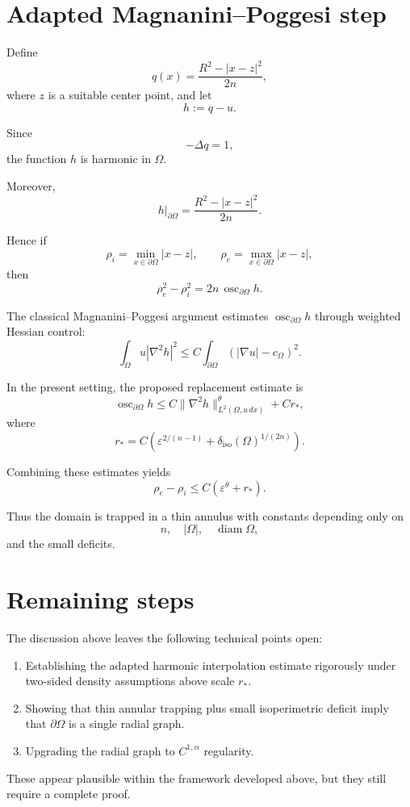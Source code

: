 \documentclass[11pt]{article}
\newcommand{\eps}{\varepsilon}
\newcommand{\deliso}{\delta_{\mathrm{iso}}}
\begin{document}
\section{Adapted Magnanini--Poggesi step}

Define
\[
q(x)
=
\frac{R^2-|x-z|^2}{2n},
\]
where $z$ is a suitable center point, and let
\[
h:=q-u.
\]

Since
\[
-\Delta q=1,
\]
the function $h$ is harmonic in $\Omega$.

Moreover,
\[
h|_{\partial\Omega}
=
\frac{R^2-|x-z|^2}{2n}.
\]

Hence if
\[
\rho_i
=
\min_{x\in\partial\Omega}|x-z|,
\qquad
\rho_e
=
\max_{x\in\partial\Omega}|x-z|,
\]
then
\[
\rho_e^2-\rho_i^2
=
2n\,
\operatorname{osc}_{\partial\Omega} h.
\]

The classical Magnanini--Poggesi argument estimates
$\operatorname{osc}_{\partial\Omega} h$
through weighted Hessian control:
\[
\int_\Omega
u |\nabla^2 h|^2
\le
C
\int_{\partial\Omega}
(|\nabla u|-c_\Omega)^2.
\]

In the present setting, the proposed replacement estimate is
\[
\operatorname{osc}_{\partial\Omega} h
\le
C
\|\nabla^2 h\|_{L^2(\Omega,u\,dx)}^\theta
+
C r_*,
\]
where
\[
r_*
=
C
\left(
\eps^{2/(n-1)}
+
\deliso(\Omega)^{1/(2n)}
\right).
\]

Combining these estimates yields
\[
\rho_e-\rho_i
\le
C
\left(
\eps^\theta
+
r_*
\right).
\]

Thus the domain is trapped in a thin annulus with constants depending only on
\[
n,
\quad
|\Omega|,
\quad
\operatorname{diam}\Omega,
\]
and the small deficits.

\section{Remaining steps}

The discussion above leaves the following technical points open:

\begin{enumerate}[label=(\arabic*)]
\item Establishing the adapted harmonic interpolation estimate rigorously under two-sided density assumptions above scale $r_*$.

\item Showing that thin annular trapping plus small isoperimetric deficit imply that $\partial\Omega$ is a single radial graph.

\item Upgrading the radial graph to $C^{1,\alpha}$ regularity.
\end{enumerate}

These appear plausible within the framework developed above,
but they still require a complete proof.
\end{document}

